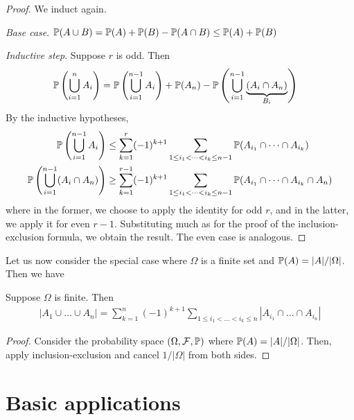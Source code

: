 \documentclass{../../template/note}
\begin{document}
    \begin{proof}
        We induct again.

        \emph{Base case}. \(\mathbb P(A \cup B) = \mathbb P(A) + \mathbb P(B) - \mathbb P(A \cap B) \leq \mathbb P(A) + \mathbb P(B)\)

        \emph{Inductive step}. Suppose \(r\) is odd. Then
        \begin{align*}
            \mathbb P\left(\bigcup_{i=1}^n A_i\right) &= \mathbb P\left(\bigcup_{i=1}^{n-1} A_i\right) + \mathbb P(A_n) - \mathbb P\left(\bigcup_{i=1}^{n-1} \underbrace{\left(A_i \cap A_n\right)}_{B_i}\right)
        \end{align*}
        By the inductive hypotheses,
        \begin{align*}
            \mathbb P\left(\bigcup_{i=1}^{n-1} A_i\right) &\leq \sum_{k=1}^{r} (-1)^{k+1} \sum_{1 \leq i_1 < \dots < i_k \leq n-1} \mathbb P(A_{i_1} \cap \dots \cap A_{i_k}) \\
            \mathbb P\left(\bigcup_{i=1}^{n-1} (A_i \cap A_n)\right) &\geq \sum_{k=1}^{r-1} (-1)^{k+1} \sum_{1 \leq i_1 < \dots < i_k \leq n-1} \mathbb P(A_{i_1} \cap \dots \cap A_{i_k} \cap A_n)
        \end{align*}
        where in the former, we choose to apply the identity for odd \(r\), and in the latter, we apply it for even \(r-1\). Substituting much as for the proof of the inclusion-exclusion formula, we obtain the result. The even case is analogous.
    \end{proof}
    
    Let us now consider the special case where \(\Omega\) is a finite set and \(\mathbb P(A) = | A| /| \Omega| \). Then we have

    \begin{corollary}
        Suppose \(\Omega\) is finite. Then
        \begin{align*}
            | A_1 \cup \dots \cup A_n|  = \sum_{k=1}^n (-1)^{k+1} \sum_{1 \leq i_1 < \dots < i_k \leq n} | A_{i_1} \cap \dots \cap A_{i_n}| 
        \end{align*}
    \end{corollary}
    
    \begin{proof}
        Consider the probability space \((\Omega, \mathcal F, \mathbb P)\) where \(\mathbb P(A) = | A| /| \Omega| \). Then, apply inclusion-exclusion and cancel \(1/| \Omega| \) from both sides.
    \end{proof}
    
    \section{Basic applications}
\end{document}
